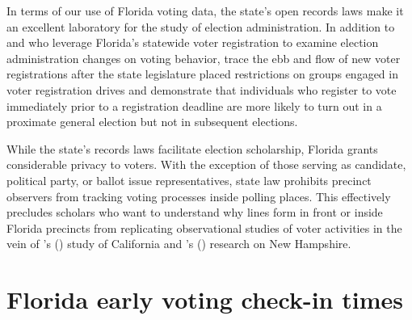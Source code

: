 \documentclass[12pt,titlepage]{article}
\newcommand{\possessivecite}[1]{\citeauthor{#1}'s (\citeyear{#1})}
\begin{document}
In terms of our use of Florida voting data, the state's open records
laws make it an excellent laboratory for the study of election
administration. In addition to \cite{amos_etal2017} and \cite{herronsmith:closingtimes} who 
leverage Florida's statewide voter registration to examine election 
administration changes on voting behavior, \cite{herron_smith2013} trace the ebb and flow of new voter
registrations after the state legislature placed restrictions on
groups engaged in voter registration drives and \cite{shinosmith:registrationtiming} 
demonstrate that individuals who register to vote immediately prior to a registration deadline are more
likely to turn out in a proximate general election but not in
subsequent elections.






While the state's records laws facilitate election scholarship,
Florida grants considerable privacy to voters.  With the exception of
those serving as candidate, political party, or ballot issue
representatives, state law prohibits precinct observers from tracking
voting processes inside polling places. This effectively precludes
scholars who want to understand why lines form in front or inside
Florida precincts from replicating observational studies of voter
activities in the vein of \possessivecite{spencermarkovits:renege}
study of California and \possessivecite{herronsmith:hanoverstudy}
research on New Hampshire.

\section*{Florida early voting check-in times}
\end{document}
